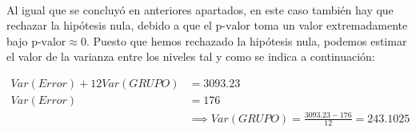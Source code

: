 \documentclass{article}
\begin{document}
      \paragraph{}
      Al igual que se concluyó en anteriores apartados, en este caso también hay que rechazar la hipótesis nula, debido a que el $\text{p-valor}$ toma un valor extremadamente bajo $\text{p-valor}\approx 0$. Puesto que hemos rechazado la hipótesis nula, podemos estimar el valor de la varianza entre los niveles tal y como se indica a continuación:

      \begin{align}
        Var(Error) + 12 Var(GRUPO) &= 3093.23\\
        Var(Error) &= 176 \\
        &\implies Var(GRUPO) = \frac{3093.23 - 176}{12} = 243.1025
      \end{align}
\end{document}
